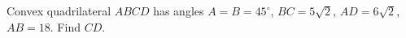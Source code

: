 Convex quadrilateral $ABCD$ has angles $A=B=45^\circ$, $BC=5\sqrt2$, $AD=6\sqrt2$, $AB=18$. Find $CD$.
